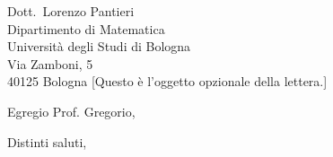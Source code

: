 \documentclass[shortindent]{letteracdp}
\date{\today} %
\begin{document}
\begin{letter}{
Dott.~Lorenzo Pantieri \\
Dipartimento di Matematica \\
Università degli Studi di Bologna \\
Via Zamboni, 5 \\
40125 Bologna
}
[Questo è l’oggetto opzionale della lettera.]

\opening{Egregio Prof. Gregorio,}

\lipsum[1]

\lipsum[2]

\closing{Distinti saluti,}

\end{letter}
\end{document}
